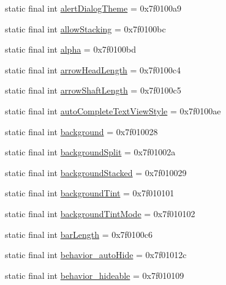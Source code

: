 \begin{CompactItemize}
static final int \hyperlink{classandroid_1_1support_1_1coreutils_1_1_r_1_1attr_ca699b939b3e164d72fa2346a6b005f3}{alertDialogTheme} = 0x7f0100a9
\item 
static final int \hyperlink{classandroid_1_1support_1_1coreutils_1_1_r_1_1attr_25a894b7fd153d96d7815e4648f0687b}{allowStacking} = 0x7f0100bc
\item 
static final int \hyperlink{classandroid_1_1support_1_1coreutils_1_1_r_1_1attr_416c183c9511e0c3df7cbe73a5bae290}{alpha} = 0x7f0100bd
\item 
static final int \hyperlink{classandroid_1_1support_1_1coreutils_1_1_r_1_1attr_a2fbe5c7b0c2fd46642dcf995062e58d}{arrowHeadLength} = 0x7f0100c4
\item 
static final int \hyperlink{classandroid_1_1support_1_1coreutils_1_1_r_1_1attr_fb0bd49018425f7a41b1b20d650c88df}{arrowShaftLength} = 0x7f0100c5
\item 
static final int \hyperlink{classandroid_1_1support_1_1coreutils_1_1_r_1_1attr_540fda5c90441ff2b7f3f73b4c78a3b8}{autoCompleteTextViewStyle} = 0x7f0100ae
\item 
static final int \hyperlink{classandroid_1_1support_1_1coreutils_1_1_r_1_1attr_1a64bfbd5eedd36852a8231a27ec7706}{background} = 0x7f010028
\item 
static final int \hyperlink{classandroid_1_1support_1_1coreutils_1_1_r_1_1attr_d4f5572dac68d20a7e967d6ce758ddc9}{backgroundSplit} = 0x7f01002a
\item 
static final int \hyperlink{classandroid_1_1support_1_1coreutils_1_1_r_1_1attr_e9e84abbf14f33931b1a8615db14a4fa}{backgroundStacked} = 0x7f010029
\item 
static final int \hyperlink{classandroid_1_1support_1_1coreutils_1_1_r_1_1attr_b2d44596291d255fb0e3d39827060a85}{backgroundTint} = 0x7f010101
\item 
static final int \hyperlink{classandroid_1_1support_1_1coreutils_1_1_r_1_1attr_54dc800222c114abb07ff964249dbf46}{backgroundTintMode} = 0x7f010102
\item 
static final int \hyperlink{classandroid_1_1support_1_1coreutils_1_1_r_1_1attr_640c96474609be7c58d8d11020777d7e}{barLength} = 0x7f0100c6
\item 
static final int \hyperlink{classandroid_1_1support_1_1coreutils_1_1_r_1_1attr_d2d3c4e65587ef2977995149bb251bae}{behavior\_\-autoHide} = 0x7f01012c
\item 
static final int \hyperlink{classandroid_1_1support_1_1coreutils_1_1_r_1_1attr_83f1b0092123bfa31978da14fae0ceea}{behavior\_\-hideable} = 0x7f010109

\end{CompactItemize}
